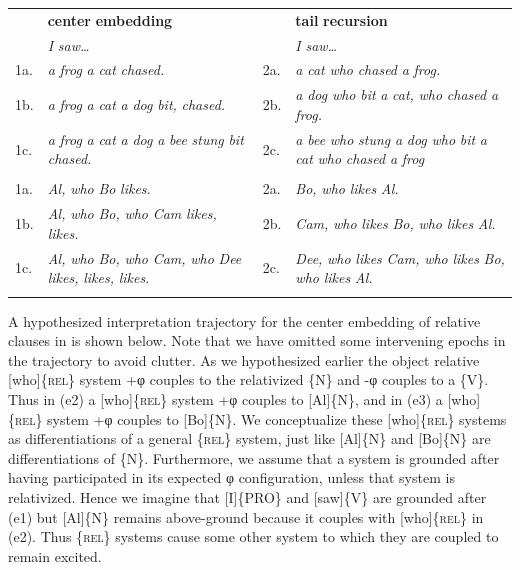 \begin{tabularx}{\textwidth}{XXXX} & \textbf{center} \textbf{embedding} &  & \textbf{tail} \textbf{recursion}\\
\lsptoprule
& \textit{I} \textit{saw…} &  & \textit{I} \textit{saw…}\\
1a. & \textit{a} \textit{frog} \textit{a} \textit{cat} \textit{chased.} & 2a. & \textit{a} \textit{cat} \textit{who} \textit{chased} \textit{a} \textit{frog.}\\
1b. & \textit{a} \textit{frog} \textit{a} \textit{cat} \textit{a} \textit{dog} \textit{bit,} \textit{chased.} & 2b. & \textit{a} \textit{dog} \textit{who} \textit{bit} \textit{a} \textit{cat,} \textit{who} \textit{chased} \textit{a} \textit{frog.}\\
1c. & \textit{a} \textit{frog} \textit{a} \textit{cat} \textit{a} \textit{dog} \textit{a} \textit{bee} \textit{stung} \textit{bit} \textit{chased.} & 2c. & \textit{a} \textit{bee} \textit{who} \textit{stung} \textit{a} \textit{dog} \textit{who} \textit{bit} \textit{a} \textit{cat} \textit{who} \textit{chased} \textit{a} \textit{frog}\\
&  &  & \\
1a. & \textit{Al,} \textit{who} \textit{Bo} \textit{likes.} & 2a. & \textit{Bo,} \textit{who} \textit{likes} \textit{Al.}\\
1b. & \textit{Al,} \textit{who} \textit{Bo,} \textit{who} \textit{Cam} \textit{likes,} \textit{likes.} & 2b. & \textit{Cam,} \textit{who} \textit{likes} \textit{Bo,} \textit{who} \textit{likes} \textit{Al.}\\
1c. & \textit{Al,} \textit{who} \textit{Bo,} \textit{who} \textit{Cam,} \textit{who} \textit{Dee} \textit{likes,} \textit{likes,} \textit{likes.} & 2c. & \textit{Dee,} \textit{who} \textit{likes} \textit{Cam,} \textit{who} \textit{likes} \textit{Bo,} \textit{who} \textit{likes} \textit{Al.}\\
\lspbottomrule
\end{tabularx}
  A hypothesized interpretation trajectory for the center embedding of relative clauses in  is shown below. Note that we have omitted some intervening epochs in the trajectory to avoid clutter. As we hypothesized earlier the object relative [who]\{\textsc{rel}\} system +φ couples to the relativized \{N\} and -φ couples to a \{V\}. Thus in (e2) a [who]\{\textsc{rel}\} system +φ couples to [Al]\{N\}, and in (e3) a [who]\{\textsc{rel}\} system +φ couples to [Bo]\{N\}. We conceptualize these [who]\{\textsc{rel}\} systems as differentiations of a general \{\textsc{rel}\} system, just like [Al]\{N\} and [Bo]\{N\} are differentiations of \{N\}. Furthermore, we assume that a system is grounded after having participated in its expected φ configuration, unless that system is relativized. Hence we imagine that [I]\{\textsc{PRO}\} and [saw]\{V\} are grounded after (e1) but [Al]\{N\} remains above-ground because it couples with [who]\{\textsc{rel}\} in (e2). Thus \{\textsc{rel}\} systems cause some other system to which they are coupled to remain excited.

